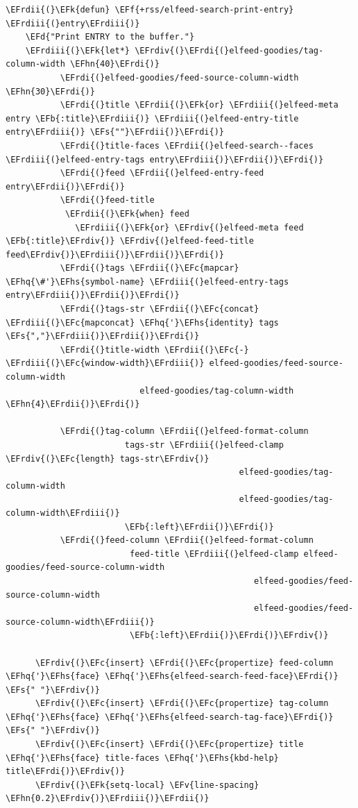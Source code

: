 \documentclass{scrartcl}
\newcommand{\EFk}[1]{\textcolor{EFk}{#1}} %
\newcommand{\EFd}[1]{\textcolor{EFd}{\textit{#1}}} %
\newcommand{\EFs}[1]{\textcolor{EFs}{#1}} %
\newcommand{\EFb}[1]{\textcolor{EFb}{#1}} %
\newcommand{\EFc}[1]{\textcolor{EFc}{#1}} %
\newcommand{\EFv}[1]{\textcolor{EFv}{#1}} %
\newcommand{\EFf}[1]{\textcolor{EFf}{#1}} %
\newcommand{\EFhn}[1]{\textcolor{EFhn}{\textbf{#1}}} %
\newcommand{\EFhq}[1]{\textcolor{EFhq}{#1}} %
\newcommand{\EFhs}[1]{\textcolor{EFhs}{#1}} %
\newcommand{\EFrdi}[1]{\textcolor{EFrdi}{#1}} %
\newcommand{\EFrdii}[1]{\textcolor{EFrdii}{#1}} %
\newcommand{\EFrdiii}[1]{\textcolor{EFrdiii}{#1}} %
\newcommand{\EFrdiv}[1]{\textcolor{EFrdiv}{#1}} %
\begin{document}
\begin{Code}
\begin{Verbatim}[]
  \EFrdii{(}\EFk{defun} \EFf{+rss/elfeed-search-print-entry} \EFrdiii{(}entry\EFrdiii{)}
    \EFd{"Print ENTRY to the buffer."}
    \EFrdiii{(}\EFk{let*} \EFrdiv{(}\EFrdi{(}elfeed-goodies/tag-column-width \EFhn{40}\EFrdi{)}
           \EFrdi{(}elfeed-goodies/feed-source-column-width \EFhn{30}\EFrdi{)}
           \EFrdi{(}title \EFrdii{(}\EFk{or} \EFrdiii{(}elfeed-meta entry \EFb{:title}\EFrdiii{)} \EFrdiii{(}elfeed-entry-title entry\EFrdiii{)} \EFs{""}\EFrdii{)}\EFrdi{)}
           \EFrdi{(}title-faces \EFrdii{(}elfeed-search--faces \EFrdiii{(}elfeed-entry-tags entry\EFrdiii{)}\EFrdii{)}\EFrdi{)}
           \EFrdi{(}feed \EFrdii{(}elfeed-entry-feed entry\EFrdii{)}\EFrdi{)}
           \EFrdi{(}feed-title
            \EFrdii{(}\EFk{when} feed
              \EFrdiii{(}\EFk{or} \EFrdiv{(}elfeed-meta feed \EFb{:title}\EFrdiv{)} \EFrdiv{(}elfeed-feed-title feed\EFrdiv{)}\EFrdiii{)}\EFrdii{)}\EFrdi{)}
           \EFrdi{(}tags \EFrdii{(}\EFc{mapcar} \EFhq{\#'}\EFhs{symbol-name} \EFrdiii{(}elfeed-entry-tags entry\EFrdiii{)}\EFrdii{)}\EFrdi{)}
           \EFrdi{(}tags-str \EFrdii{(}\EFc{concat} \EFrdiii{(}\EFc{mapconcat} \EFhq{'}\EFhs{identity} tags \EFs{","}\EFrdiii{)}\EFrdii{)}\EFrdi{)}
           \EFrdi{(}title-width \EFrdii{(}\EFc{-} \EFrdiii{(}\EFc{window-width}\EFrdiii{)} elfeed-goodies/feed-source-column-width
                           elfeed-goodies/tag-column-width \EFhn{4}\EFrdii{)}\EFrdi{)}

           \EFrdi{(}tag-column \EFrdii{(}elfeed-format-column
                        tags-str \EFrdiii{(}elfeed-clamp \EFrdiv{(}\EFc{length} tags-str\EFrdiv{)}
                                               elfeed-goodies/tag-column-width
                                               elfeed-goodies/tag-column-width\EFrdiii{)}
                        \EFb{:left}\EFrdii{)}\EFrdi{)}
           \EFrdi{(}feed-column \EFrdii{(}elfeed-format-column
                         feed-title \EFrdiii{(}elfeed-clamp elfeed-goodies/feed-source-column-width
                                                  elfeed-goodies/feed-source-column-width
                                                  elfeed-goodies/feed-source-column-width\EFrdiii{)}
                         \EFb{:left}\EFrdii{)}\EFrdi{)}\EFrdiv{)}

      \EFrdiv{(}\EFc{insert} \EFrdi{(}\EFc{propertize} feed-column \EFhq{'}\EFhs{face} \EFhq{'}\EFhs{elfeed-search-feed-face}\EFrdi{)} \EFs{" "}\EFrdiv{)}
      \EFrdiv{(}\EFc{insert} \EFrdi{(}\EFc{propertize} tag-column \EFhq{'}\EFhs{face} \EFhq{'}\EFhs{elfeed-search-tag-face}\EFrdi{)} \EFs{" "}\EFrdiv{)}
      \EFrdiv{(}\EFc{insert} \EFrdi{(}\EFc{propertize} title \EFhq{'}\EFhs{face} title-faces \EFhq{'}\EFhs{kbd-help} title\EFrdi{)}\EFrdiv{)}
      \EFrdiv{(}\EFk{setq-local} \EFv{line-spacing} \EFhn{0.2}\EFrdiv{)}\EFrdiii{)}\EFrdii{)}


\end{Verbatim}
\end{Code}
\end{document}
